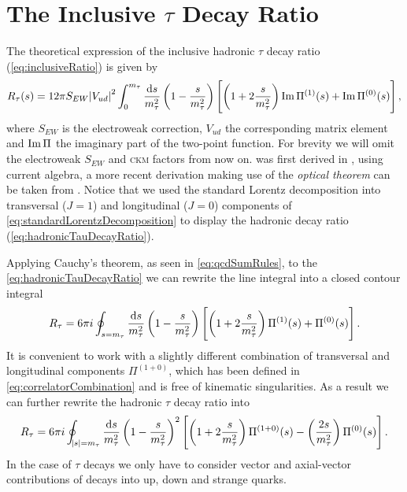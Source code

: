 \documentclass[../../index.tex]{subfiles}
\begin{document}
\section{The Inclusive \(\tau\) Decay Ratio}
The theoretical expression of the inclusive hadronic \(\tau\) decay ratio
(\cref{eq:inclusiveRatio}) is given by
\begin{equation}
  \label{eq:hadronicTauDecayRatio}
  R_\tau(s) = 12 \pi S_{EW} \abs{V_{ud}}^2 \int_0^{m_\tau} \frac{\dif s}{m_\tau^2}
  \left( 1 - \frac{s}{m_\tau^2} \right)
  \left[ \left( 1 + 2 \frac{s}{m_\tau^2} \right) \Ima \Pi^{(1)}(s) + \Ima \Pi^{(0)}(s) \right],
\end{equation}
where \(S_{EW}\) is the electroweak correction, \(V_{ud}\) the corresponding
 matrix element and $\operatorname{Im} \Pi$ the
imaginary part of the two-point function. For brevity we will omit the
electroweak \(S_{EW}\) and \textsc{ckm} factors from now on.
 was first derived in \cite{Tsai1971}, using
current algebra, a more recent derivation making use of the \textit{optical
  theorem} can be taken from \cite{Schwab2002}. Notice that we used the standard
Lorentz decomposition into transversal (\(J=1\)) and longitudinal (\(J=0\))
components of \cref{eq:standardLorentzDecomposition} to display the hadronic
decay ratio (\cref{eq:hadronicTauDecayRatio}).

Applying Cauchy's theorem, as seen in \cref{eq:qcdSumRules}, to the
\cref{eq:hadronicTauDecayRatio} we can rewrite the line integral into a closed
contour integral
\begin{equation}
  \label{eq:rTauT+L}
  R_\tau = 6 \pi i \oint_{s=m_\tau} \frac{\dif s}{m_\tau^2}
  \left( 1 - \frac{s}{m_\tau^2} \right)
  \left[ \left( 1 + 2 \frac{s}{m_\tau^2} \right) \Pi^{(1)}(s) + \Pi^{(0)}(s) \right].
\end{equation}
It is convenient to work with a slightly different combination of transversal
and longitudinal components \(\Pi^{(1+0)}\), which has been defined in
\cref{eq:correlatorCombination} and is free of kinematic singularities. As a
result we can further rewrite the hadronic \(\tau\) decay ratio into
\begin{equation}
  \label{eq:tauDecayRatioTL}
  R_\tau = 6 \pi i \oint_{\abs{s}=m_\tau} \frac{\dif s}{m_\tau^2}
  \left( 1 - \frac{s}{m_\tau^2} \right)^2
  \left[ \left( 1 + 2 \frac{s}{m_\tau^2} \right) \Pi^{(1+0)}(s) - \left( \frac{2 s}{m_\tau^2} \right) \Pi^{(0)}(s) \right].
\end{equation}
In the case of \(\tau\) decays we only have to consider vector and axial-vector
contributions of decays into up, down and strange quarks.
\end{document}
